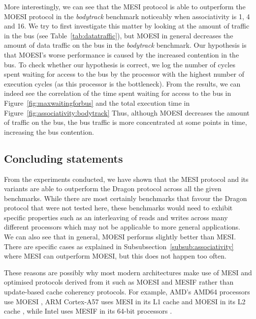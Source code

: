 \documentclass[nonacm,acmsmall,screen,11pt]{acmart}
\begin{document}
More interestingly, we can see that the MESI protocol is able to outperform the MOESI protocol in the \textit{bodytrack} benchmark noticeably when associativity is 1, 4 and 16.
We try to first investigate this matter by looking at the amount of traffic in the bus (see Table~\ref{tab:datatraffic}), but MOESI in general decreases the amount of data traffic on the bus in the \textit{bodytrack} benchmark.
Our hypothesis is that MOESI's worse performance is caused by the increased contention in the bus.
To check whether our hypothesis is correct, we log the number of cycles spent waiting for access to the bus by the processor with the highest number of execution cycles (as this processor is the bottleneck).
From the results, we can indeed see the correlation of the time spent waiting for access to the bus in Figure~\ref{fig:maxwaitingforbus} and the total execution time in Figure~\ref{fig:associativity:bodytrack}
Thus, although MOESI decreases the amount of traffic on the bus, the bus traffic is more concentrated at some points in time, increasing the bus contention.

\subsection{Concluding statements}
From the experiments conducted, we have shown that the MESI protocol and its variants are able to outperform the Dragon protocol across all the given benchmarks. While there are most certainly benchmarks that favour the Dragon protocol that were not tested here, these benchmarks would need to exhibit specific properties such as an interleaving of reads and writes across many different processors which may not be applicable to more general applications. We can also see that in general, MOESI performs slightly better than MESI. There are specific cases as explained in Subsubsection~\ref{subsub:associativity} where MESI can outperform MOESI, but this does not happen too often.

These reasons are possibly why most modern architectures make use of MESI and optimised protocols derived from it such as MOESI and MESIF rather than update-based cache coherency protocols. For example, AMD's AMD64 processors use MOESI \cite{devices2006amd64}, ARM Cortex-A57 uses MESI in its L1 cache and MOESI in its L2 cache \cite{holdingsarm}, while Intel uses MESIF in its 64-bit processors \cite{thomadakis2011architecture}.



\end{document}
